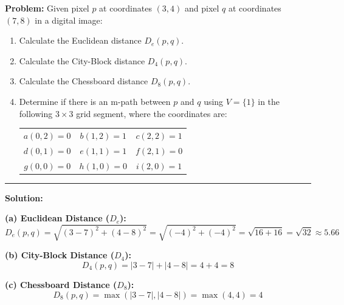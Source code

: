 \documentclass[12pt,a4paper]{article}
\begin{document}
\begin{tcolorbox}[examplebox, title={Distance Calculations and Path Analysis}]
\textbf{Problem:} Given pixel $p$ at coordinates $(3,4)$ and pixel $q$ at coordinates $(7,8)$ in a digital image:
\begin{enumerate}[label=(\alph*), leftmargin=*, itemsep=2pt]
  \item Calculate the Euclidean distance $D_e(p,q)$.
  \item Calculate the City-Block distance $D_4(p,q)$.
  \item Calculate the Chessboard distance $D_8(p,q)$.
  \item Determine if there is an m-path between $p$ and $q$ using $V = \{1\}$ in the following $3 \times 3$ grid segment, where the coordinates are:
  \begin{center}
    \begin{tabular}{c c c}$a(0,2) = 0$ & $b(1,2) = 1$ & $c(2,2) = 1$ \\
      $d(0,1) = 0$ & $e(1,1) = 1$ & $f(2,1) = 0$ \\
      $g(0,0) = 0$ & $h(1,0) = 0$ & $i(2,0) = 1$
\end{tabular}
  \end{center}
\end{enumerate}

\par\noindent\rule{\linewidth}{0.5pt}\par
\textbf{Solution:}
\par\noindent
\textbf{(a) Euclidean Distance ($D_e$):}
\begin{equation*}
  D_e(p,q) = \sqrt{(3-7)^2 + (4-8)^2} = \sqrt{(-4)^2 + (-4)^2} = \sqrt{16+16} = \sqrt{32} \approx 5.66
\end{equation*}

\textbf{(b) City-Block Distance ($D_4$):}
\begin{equation*}
  D_4(p,q) = |3-7| + |4-8| = 4 + 4 = 8
\end{equation*}

\textbf{(c) Chessboard Distance ($D_8$):}
\begin{equation*}
  D_8(p,q) = \max(|3-7|, |4-8|) = \max(4, 4) = 4
\end{equation*}


\end{tcolorbox}
\end{document}

